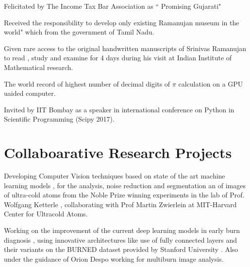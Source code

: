 \documentclass[]{deedy-resume-openfont}
\begin{document}
\begin{tightemize}
\item Felicitated by The Income Tax Bar Association as “ Promising Gujarati"
\item Received the responsibility to develop \The only existing Ramanujan museum
in the world" which from the government of Tamil Nadu.
\item Given rare access to the original handwritten manuscripts of Srinivas Ramanujan to read , study and examine for 4 days during his visit at Indian Institute of Mathematical research.
\item The world record of highest number of decimal digits of $\pi$ calculation on a GPU uaided computer. 
\item Invited by IIT Bombay as a speaker in international conference on Python in Scientific Programming (Scipy 2017).
\end{tightemize}
\sectionsep








\section{Collaboarative Research Projects}
\hline
\vspace{\topsep}


Developing Computer Vision techniques based on state of the art machine learning models , for the analysis, noise reduction and segmentation an of images of ultra-cold atoms from the Noble Prize winning experiments in the lab of Prof.  Wolfgang Ketterle , collaborating with Prof Martin Zwierlein at MIT-Harvard Center for Ultracold Atoms.

\sectionsep

Working on the improvement of the current deep learning models in early burn diagnosis , using innovative architectures like use of fully connected layers and their variants on the BURNED dataset provided by Stanford University .  Also under the guidance of Orion Despo working for multiburn image analysis.
\sectionsep
\end{document}
